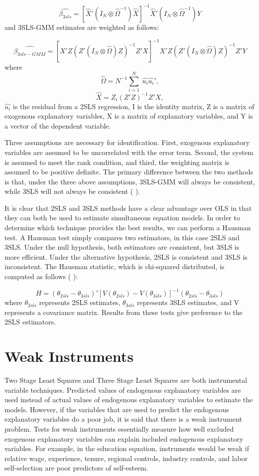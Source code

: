 \documentclass[12pt]{report}
\newcommand{\beq}{\begin{equation}}
\newcommand{\eeq}{\end{equation}}
\newcommand{\citee}[1]{\citename{#1} \citeyear{#1}}
\begin{document}
\beq \hat{\beta_{3sls}} = [\hat{X}' (I_N \otimes \hat{\Omega}^{-1}) \hat{X}]^{-1} \hat{X}' (I_N \otimes \hat{\Omega}^{-1}) Y\eeq
and 3SLS-GMM estimates are weighted as follows:

\beq \hat{\beta_{3sls-GMM}} = [X' Z (Z' (I_N \otimes \hat{\Omega}) Z)^{-1} Z' X]^{-1} X' Z (Z' (I_N \otimes \hat{\Omega}) Z)^{-1} Z' Y\eeq
where
\beq \hat{\Omega} = N^{-1} \sum_{i=1}^N\ \hat{u_i} \hat{u_i}' ,\eeq
\beq \hat{X} = Z_i (Z' Z)^{-1} Z' X ,\eeq
$\hat{u_i}$ is the residual from a 2SLS regression, I is the identity matrix, Z is a matrix of exogenous explanatory variables, X is a matrix of explanatory variables, and Y is a vector of the dependent variable.

Three assumptions are necessary for identification. First, exogenous explanatory variables are assumed to be uncorrelated with the error term. Second, the system is assumed to meet the rank condition, and third, the weighting matrix is assumed to be positive definite. The primary difference between the two methods is that, under the three above assumptions, 3SLS-GMM will always be consistent, while 3SLS will not always be consistent (\citee{W2002}).

It is clear that 2SLS and 3SLS methods have a clear advantage over OLS in that they can both be used to estimate simultaneous equation models. In order to determine which technique provides the best results, we can perform a Hausman test. A Hausman test simply compares two estimators, in this case 2SLS and 3SLS. Under the null hypothesis, both estimators are consistent, but 3SLS is more efficient. Under the alternative hypothesis, 2SLS is consistent and 3SLS is inconsistent. The Hausman statistic, which is chi-squared distributed, is computed as follows (\citee{CT2009}):

\beq H = (\theta_{2sls} - \theta_{3sls})'[V(\theta_{2sls})-V(\theta_{3sls})]^{-1} (\theta_{2sls} - \theta_{3sls})\eeq
where $\theta_{2sls}$ represents 2SLS estimates, $\theta_{3sls}$ represents 3SLS estimates, and V represents a covariance matrix. Results from these tests give preference to the 2SLS estimators.

\section*{Weak Instruments}

Two Stage Least Squares and Three Stage Least Squares are both instrumental variable techniques. Predicted values of endogenous explanatory variables are used instead of actual values of endogenous explanatory variables to estimate the models. However, if the variables that are used to predict the endogenous explanatory variables do a poor job, it is said that there is a weak instrument problem. Tests for weak instruments essentially measure how well excluded exogenous explanatory variables can explain included endogenous explanatory variables. For example, in the education equation, instruments would be weak if relative wage, experience, tenure, regional controls, industry controls, and labor self-selection are poor predictors of self-esteem.
\end{document}
